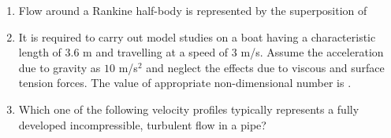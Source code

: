 \documentclass[a4paper,10pt]{article}
\begin{document}
\begin{enumerate}
    \item Flow around a Rankine half-body is represented by the superposition of
    
    \hfill{}
    \begin{enumerate}
    \end{enumerate}

    \item It is required to carry out model studies on a boat having a characteristic length of $3.6$ m and travelling at a speed of $3$ m/s. Assume the acceleration due to gravity as $10$ m/s$^2$ and neglect the effects due to viscous and surface tension forces. The value of appropriate non-dimensional number is \underline{\hspace{2cm}}.
    
    \hfill{}
    
    \item Which one of the following velocity profiles typically represents a fully developed incompressible, turbulent flow in a pipe?
    

\end{enumerate}
\end{document}
